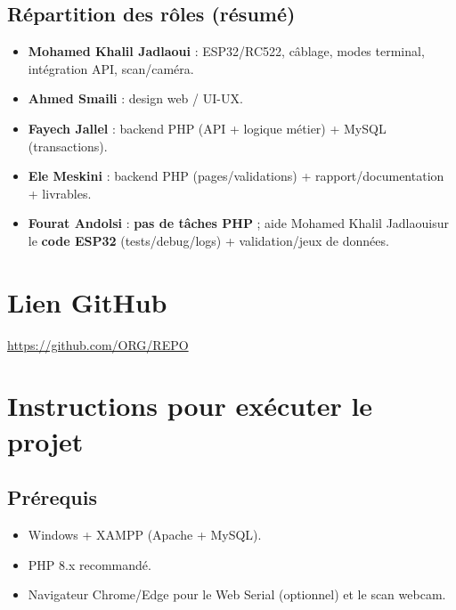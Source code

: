 \documentclass[11pt,a4paper]{article}
\newcommand{\MemberA}{Ele Meskini}
\newcommand{\MemberB}{Mohamed Khalil Jadlaoui}
\newcommand{\MemberC}{Fayech Jallel}
\newcommand{\MemberD}{Fourat Andolsi}
\newcommand{\MemberE}{Ahmed Smaili}
\newcommand{\GitHubURL}{\url{https://github.com/ORG/REPO}}
\begin{document}
\subsection{Répartition des rôles (résumé)}
\begin{itemize}
  \item \textbf{\MemberB} : ESP32/RC522, câblage, modes terminal, intégration API, scan/caméra.
  \item \textbf{\MemberE} : design web / UI-UX.
  \item \textbf{\MemberC} : backend PHP (API + logique métier) + MySQL (transactions).
  \item \textbf{\MemberA} : backend PHP (pages/validations) + rapport/documentation + livrables.
  \item \textbf{\MemberD} : \textbf{pas de tâches PHP} ; aide \MemberB sur le \textbf{code ESP32} (tests/debug/logs) + validation/jeux de données.
\end{itemize}

\section{Lien GitHub}
\GitHubURL

\section{Instructions pour exécuter le projet}
\subsection{Prérequis}
\begin{itemize}
  \item Windows + XAMPP (Apache + MySQL).
  \item PHP 8.x recommandé.
  \item Navigateur Chrome/Edge pour le Web Serial (optionnel) et le scan webcam.
\end{itemize}
\end{document}
